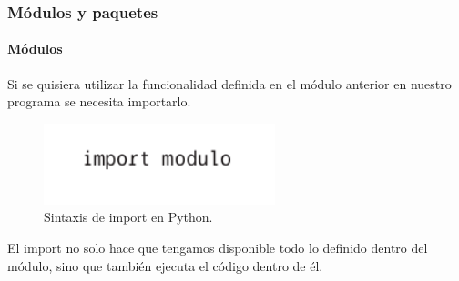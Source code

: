 \begin{frame}[fragile]
  \frametitle{M\'odulos y paquetes}

  \framesubtitle{M\'odulos}

  Si se quisiera utilizar la funcionalidad definida en el m\'odulo anterior en nuestro programa se necesita importarlo.

  \begin{figure}
    \includegraphics[width=0.6\textwidth]{Imagenes/Import.jpg}
    \caption{\label{fig:Ejemplo11}Sintaxis de import en Python.} 
  \end{figure}

  El import no solo hace que tengamos disponible todo lo definido dentro del m\'odulo, sino que tambi\'en ejecuta el c\'odigo dentro de \'el. 

\end{frame}
